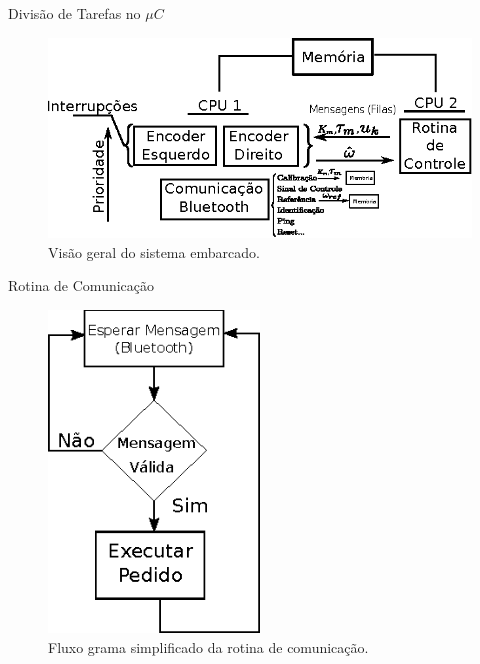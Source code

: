 \begin{frame}{Divisão de Tarefas no $\mu{}C$}
    \begin{figure}
        \centering
        \includegraphics[width=1.0\textwidth]{figuras/ilustracoes/visao_geral_do_sistema.eps}
        \caption{Visão geral do sistema embarcado.}
    \end{figure}
\end{frame}

\begin{frame}{Rotina de Comunicação}
    
    \begin{figure}
        \centering
        \includegraphics[width=0.5\textwidth]{figuras/ilustracoes/ilustracao_rotina_de_comunicacao.eps}
        \caption{Fluxo grama simplificado da rotina de comunicação.}
    \end{figure}
        
\end{frame}


